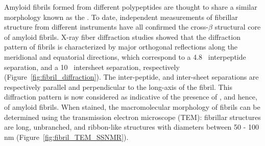 Amyloid fibrils formed from different polypeptides are thought to share a similar morphology known as the \crossbs.\cite{Chiti:2006fz} To date, independent measurements of fibrillar structure from different instruments have all confirmed the cross-$\beta$ structural core of amyloid fibrils.  X-ray fiber diffraction studies showed that the diffraction pattern of fibrils is characterized by major orthogonal reflections along the meridional and equatorial directions, which correspond to a 4.8 \angstrom\ interpeptide separation, and a 10 \angstrom\ intersheet separation, respectively (Figure~\ref{fig:fibril_diffraction}).\cite{Sunde:1997cq,Makin:2005un,Sipe:2000fs} The inter-peptide, and inter-sheet separations are respectively parallel and perpendicular to the long-axis of the fibril. This diffraction pattern is now considered as indicative of the presence of \crossbs, and hence, of amyloid fibrils.\cite{Chiti:2006fz} When stained, the macromolecular morphology of fibrils can be determined using the transmission electron microscope (TEM): fibrillar structures are long, unbranched, and ribbon-like structures with diameters between 50 - 100 nm (Figure~\ref{fig:fibril_TEM_SSNMR}).\cite{Chiti:2006fz} 


